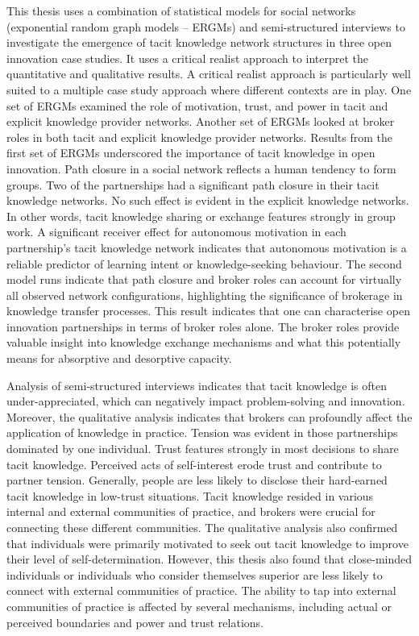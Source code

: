 \documentclass[12pt,table,xcdraw]{book}
\begin{document}
This thesis uses a combination of statistical models for social networks (exponential random graph models -- ERGMs) and semi-structured interviews to investigate the emergence of tacit knowledge network structures in three open innovation case studies. It uses a critical realist approach to interpret the quantitative and qualitative results. A critical realist approach is particularly well suited to a multiple case study approach where different contexts are in play. One set of ERGMs examined the role of motivation, trust, and power in tacit and explicit knowledge provider networks. Another set of ERGMs looked at broker roles in both tacit and explicit knowledge provider networks. Results from the first set of ERGMs underscored the importance of tacit knowledge in open innovation. Path closure in a social network reflects a human tendency to form groups. Two of the partnerships had a significant path closure in their tacit knowledge networks. No such effect is evident in the explicit knowledge networks. In other words, tacit knowledge sharing or exchange features strongly in group work. A significant receiver effect for autonomous motivation in each partnership's tacit knowledge network indicates that autonomous motivation is a reliable predictor of learning intent or knowledge-seeking behaviour. The second model runs indicate that path closure and broker roles can account for virtually all observed network configurations, highlighting the significance of brokerage in knowledge transfer processes. This result indicates that one can characterise open innovation partnerships in terms of broker roles alone. The broker roles provide valuable insight into knowledge exchange mechanisms and what this potentially means for absorptive and desorptive capacity. \medskip

Analysis of semi-structured interviews indicates that tacit knowledge is often under-appreciated, which can negatively impact problem-solving and innovation. Moreover, the qualitative analysis indicates that brokers can profoundly affect the application of knowledge in practice. Tension was evident in those partnerships dominated by one individual. Trust features strongly in most decisions to share tacit knowledge. Perceived acts of self-interest erode trust and contribute to partner tension. Generally, people are less likely to disclose their hard-earned tacit knowledge in low-trust situations. Tacit knowledge resided in various internal and external communities of practice, and brokers were crucial for connecting these different communities. The qualitative analysis also confirmed that individuals were primarily motivated to seek out tacit knowledge to improve their level of self-determination. However, this thesis also found that close-minded individuals or individuals who consider themselves superior are less likely to connect with external communities of practice. The ability to tap into external communities of practice is affected by several mechanisms, including actual or perceived boundaries and power and trust relations. \medskip
\end{document}
